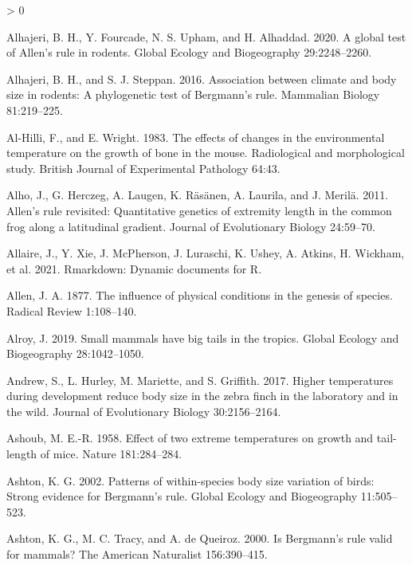 \documentclass[
]{article}
\newlength{\cslhangindent}
\newenvironment{CSLReferences}[2] %
 {%
  \setlength{\parindent}{0pt}
  \ifodd #1 \everypar{\setlength{\hangindent}{\cslhangindent}}\ignorespaces\fi
  \ifnum #2 > 0
  \setlength{\parskip}{#2\baselineskip}
  \fi
 }%
 {}
\begin{document}
\hypertarget{refs}{}
\begin{CSLReferences}{0}{0}
\leavevmode\hypertarget{ref-Alhajeri2020}{}%
Alhajeri, B. H., Y. Fourcade, N. S. Upham, and H. Alhaddad. 2020. A
global test of {Allen's} rule in rodents. Global Ecology and
Biogeography 29:2248--2260.

\leavevmode\hypertarget{ref-Alhajeri2016}{}%
Alhajeri, B. H., and S. J. Steppan. 2016. Association between climate
and body size in rodents: A phylogenetic test of {Bergmann's} rule.
Mammalian Biology 81:219--225.

\leavevmode\hypertarget{ref-Al-Hilli1983}{}%
Al-Hilli, F., and E. Wright. 1983. The effects of changes in the
environmental temperature on the growth of bone in the mouse.
Radiological and morphological study. British Journal of Experimental
Pathology 64:43.

\leavevmode\hypertarget{ref-Alho2011}{}%
Alho, J., G. Herczeg, A. Laugen, K. Räsänen, A. Laurila, and J. Merilä.
2011. Allen's rule revisited: Quantitative genetics of extremity length
in the common frog along a latitudinal gradient. Journal of Evolutionary
Biology 24:59--70.

\leavevmode\hypertarget{ref-Allaire2021}{}%
Allaire, J., Y. Xie, J. McPherson, J. Luraschi, K. Ushey, A. Atkins, H.
Wickham, et al. 2021. Rmarkdown: Dynamic documents for {R}.

\leavevmode\hypertarget{ref-Allen1877}{}%
Allen, J. A. 1877. The influence of physical conditions in the genesis
of species. Radical Review 1:108--140.

\leavevmode\hypertarget{ref-Alroy2019}{}%
Alroy, J. 2019. Small mammals have big tails in the tropics. Global
Ecology and Biogeography 28:1042--1050.

\leavevmode\hypertarget{ref-Andrew2017}{}%
Andrew, S., L. Hurley, M. Mariette, and S. Griffith. 2017. Higher
temperatures during development reduce body size in the zebra finch in
the laboratory and in the wild. Journal of Evolutionary Biology
30:2156--2164.

\leavevmode\hypertarget{ref-Ashoub1958}{}%
Ashoub, M. E.-R. 1958. Effect of two extreme temperatures on growth and
tail-length of mice. Nature 181:284--284.

\leavevmode\hypertarget{ref-Ashton2002}{}%
Ashton, K. G. 2002. Patterns of within-species body size variation of
birds: Strong evidence for {Bergmann's} rule. Global Ecology and
Biogeography 11:505--523.

\leavevmode\hypertarget{ref-Ashton2000}{}%
Ashton, K. G., M. C. Tracy, and A. de Queiroz. 2000. Is {Bergmann's}
rule valid for mammals? The American Naturalist 156:390--415.


\end{CSLReferences}
\end{document}
